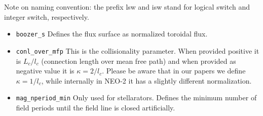 \documentclass{article}
\begin{document}
Note on naming convention: the prefix lsw and isw stand for logical
switch and integer switch, respectively.

\begin{itemize}
 \item \verb|boozer_s| \newline
 Defines the flux surface as normalized toroidal flux.
 \item \verb|conl_over_mfp|\newline
 This is the collisionality parameter. When provided positive it is
 $L_c/l_c$ (connection length over mean free path) and when provided as
 negative value it is $\kappa = 2/l_c$. Please be aware that in our
 papers we define $\kappa = 1/l_c$, while internally in NEO-2 it has a
 slightly different normalization.
 \item \verb|mag_nperiod_min|\newline
 Only used for stellarators. Defines the minimum number of field periods
 until the field line is closed artificially.
\end{itemize}
\end{document}
